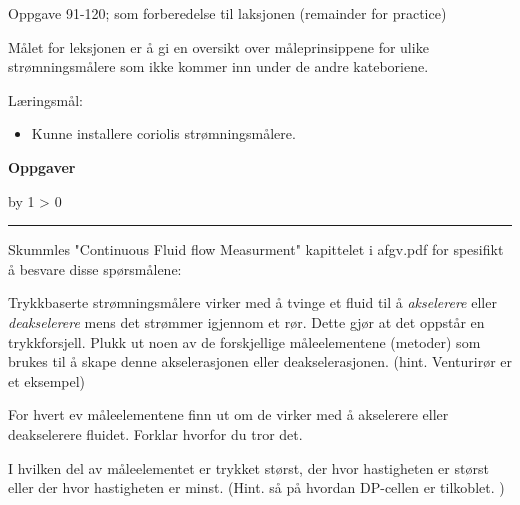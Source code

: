 \documentclass[12pt,a4paper]{article}
\def\oppgave{
            \advance\questnum by 1
            \ifnum \questnum > 0
                 \hrule
                 \vskip 3pt
                 \leftline{Oppgave \the\questnum}
                 \vskip 3pt \fi}
\begin{document}
\vskip 2pt \noindent Oppgave 91-120;  som forberedelse til laksjonen (remainder for practice)

\vskip 10pt


Målet for leksjonen er å gi en oversikt over måleprinsippene for ulike strømningsmålere som ikke kommer inn under de andre kateboriene.

	Læringsmål:
	\begin{itemize}[noitemsep]
		\item  Kunne installere coriolis strømningsmålere. 
	\end{itemize}

\vfil \eject
\vfil \eject
\centerline{\bf Oppgaver}
\vskip 5pt
\oppgave{} 


Skummles "Continuous Fluid flow Measurment" kapittelet i afgv.pdf for spesifikt å besvare disse spørsmålene:

\vskip 10pt

Trykkbaserte strømningsmålere virker med å tvinge et fluid til å \textit{akselerere} eller \textit{deakselerere} mens det strømmer igjennom et rør. Dette gjør at det oppstår en trykkforsjell. Plukk ut noen av de forskjellige måleelementene (metoder) som brukes til å skape denne akselerasjonen eller deakselerasjonen. (hint. Venturirør er et eksempel)

\vskip 10pt
For hvert ev måleelementene finn ut om de virker med å akselerere eller deakselerere fluidet. Forklar hvorfor du tror det. 

\vskip 10pt

I hvilken del av måleelementet er trykket størst, der hvor hastigheten er størst eller der hvor hastigheten er minst. (Hint. så på hvordan DP-cellen er tilkoblet. )
\end{document}

